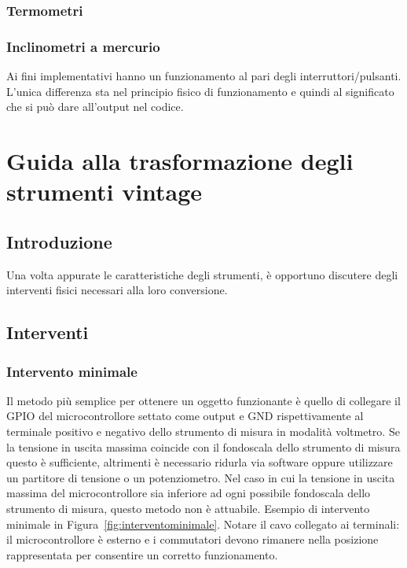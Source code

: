 \documentclass[12pt,a4paper]{report}
\begin{document}
\subsection{Termometri} 

\subsection{Inclinometri a mercurio}
Ai fini implementativi hanno un funzionamento al pari degli interruttori/pulsanti. L'unica differenza sta nel principio fisico di funzionamento
e quindi al significato che si può dare all'output nel codice.

\chapter{Guida alla trasformazione degli strumenti vintage}




\section{Introduzione}
Una volta appurate le caratteristiche degli strumenti, è opportuno discutere degli interventi fisici necessari alla loro conversione.


\section{Interventi}
\subsection{Intervento minimale}
Il metodo più semplice per ottenere un oggetto funzionante è quello di collegare il GPIO del microcontrollore settato come output
e GND rispettivamente al terminale positivo e negativo dello strumento di misura in modalità voltmetro. Se la tensione in uscita massima
coincide con il fondoscala dello strumento di misura questo è sufficiente, altrimenti è necessario ridurla via software oppure
utilizzare un partitore di tensione o un potenziometro. Nel caso in cui la tensione in uscita massima del microcontrollore sia inferiore
ad ogni possibile fondoscala dello strumento di misura, questo metodo non è attuabile. Esempio di intervento minimale in
Figura~\ref{fig:interventominimale}. Notare il cavo collegato ai terminali: il microcontrollore è esterno
e i commutatori devono rimanere nella posizione rappresentata per consentire un corretto funzionamento.
\end{document}
